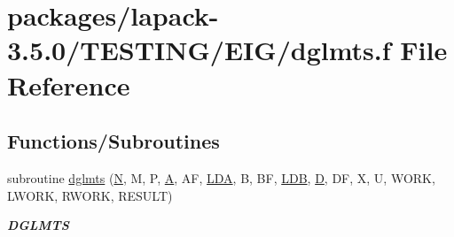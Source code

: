 \hypertarget{dglmts_8f}{}\section{packages/lapack-\/3.5.0/\+T\+E\+S\+T\+I\+N\+G/\+E\+I\+G/dglmts.f File Reference}
\label{dglmts_8f}
\subsection*{Functions/\+Subroutines}
\begin{DoxyCompactItemize}
\item 
subroutine \hyperlink{group__double__eig_gadb6ee09a4853bbafa0ad4b5f5dd26f32}{dglmts} (\hyperlink{polmisc_8c_a0240ac851181b84ac374872dc5434ee4}{N}, M, P, \hyperlink{classA}{A}, A\+F, \hyperlink{example__user_8c_ae946da542ce0db94dced19b2ecefd1aa}{L\+D\+A}, B, B\+F, \hyperlink{example__user_8c_a50e90a7104df172b5a89a06c47fcca04}{L\+D\+B}, \hyperlink{odrpack_8h_a7dae6ea403d00f3687f24a874e67d139}{D}, D\+F, X, U, W\+O\+R\+K, L\+W\+O\+R\+K, R\+W\+O\+R\+K, R\+E\+S\+U\+L\+T)
\begin{DoxyCompactList}\small\item\em {\bfseries D\+G\+L\+M\+T\+S} \end{DoxyCompactList}\end{DoxyCompactItemize}
